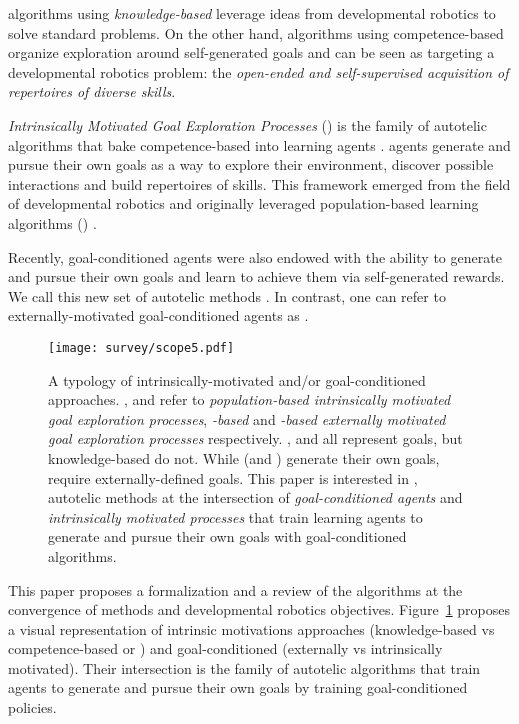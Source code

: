 \rl algorithms using \textit{knowledge-based} \ims leverage ideas from developmental robotics to solve standard \rl problems. On the other hand, \rl algorithms using competence-based \ims organize exploration around self-generated goals and can be seen as targeting a developmental robotics problem: the \textit{open-ended and self-supervised acquisition of repertoires of diverse skills}. 
 
\textit{Intrinsically Motivated Goal Exploration Processes} (\imgep) is the family of autotelic algorithms that bake competence-based \ims into learning agents \cite{imgep}. \imgep agents generate and pursue their own goals as a way to explore their environment, discover possible interactions and build repertoires of skills. This framework emerged from the field of developmental robotics \cite{oudeyer2007intrinsic,baranes2009proximo,baranes2010intrinsically,rolf2010goal} and originally leveraged population-based learning algorithms (\popimgep) \cite{baranes2009r,baranes2013active,forestier2016modular,imgep}. 

Recently, goal-conditioned \rl agents were also endowed with the ability to generate and pursue their own goals and learn to achieve them via self-generated rewards. We call this new set of autotelic methods \rlimgeps. In contrast, one can refer to externally-motivated goal-conditioned \rl agents as \rlemgeps.


\begin{figure}[h]
    \centering
    \texttt{[image: survey/scope5.pdf]}
    \caption{A typology of intrinsically-motivated and/or goal-conditioned \rl approaches. \popimgep, \rlimgep
    and \rlemgep refer to \textit{population-based intrinsically motivated goal exploration processes}, 
        \textit{\textsl{\rl}-based} \textsl{\imgep} and \textit{\textsl{\rl}-based externally motivated goal exploration
        processes} respectively. \popimgep, \rlimgep and \rlemgep all represent goals, but knowledge-based \ims
        do not. While \imgeps (\popimgep and \rlimgep) generate their own goals, \rlemgeps require
        externally-defined goals. This paper is interested in \rlimgeps, autotelic methods at the intersection of
        \textit{goal-conditioned \rl agents} and \textit{intrinsically motivated processes} that train learning
        agents to generate and pursue their own goals with goal-conditioned \rl algorithms. }
    \label{fig:scope}
\end{figure}

This paper proposes a formalization and a review of the \rlimgep algorithms at the convergence of \rl methods and developmental robotics objectives. Figure~\ref{fig:scope} proposes a visual representation of intrinsic motivations approaches (knowledge-based \ims vs competence-based \ims or \imgeps) and goal-conditioned \rl (externally vs intrinsically motivated). Their intersection is the family of autotelic algorithms that train agents to generate and pursue their own goals by training goal-conditioned policies. 

